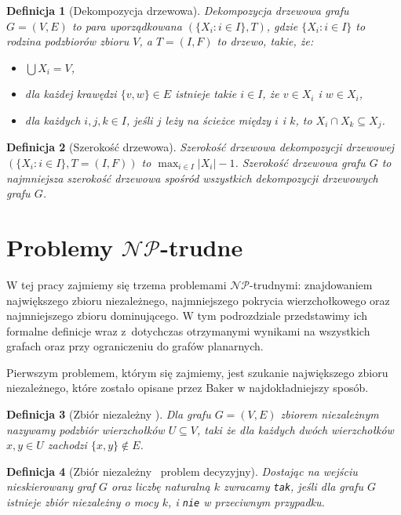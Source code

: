 \documentclass[twoside,a4paper,12pt]{report} %
\theoremstyle{break}
\newtheorem{definition}{Definicja}[section]
\begin{document}
\begin{definition}[Dekompozycja drzewowa]
Dekompozycja drzewowa grafu $G=(V,E)$ to para uporządkowana $(\{X_i\colon i \in I\}, T)$, gdzie $\{X_i\colon i \in I\}$ to rodzina podzbiorów zbioru $V$, a $T=(I,F)$ to drzewo, takie, że:
\begin{itemize}
    \item $\bigcup X_i = V$,
    \item dla każdej krawędzi $\{v,w\} \in E$ istnieje takie $i \in I$, że $v \in X_i$ i $w \in X_i$,
    \item dla każdych $i,j,k \in I$, jeśli $j$ leży na ścieżce między $i$ i $k$, to $X_i \cap X_k \subseteq X_j$.
\end{itemize}
\end{definition}

\begin{definition}[Szerokość drzewowa]
\emph{Szerokość drzewowa dekompozycji drzewowej} $(\{X_i\colon i \in I\}, T=(I,F))$ to $\max_{i \in I} |X_i|-1$. \emph{Szerokość drzewowa grafu $G$} to najmniejsza szerokość drzewowa spośród wszystkich dekompozycji drzewowych grafu $G$.
\end{definition}

\section[Problemy NP-trudne]{Problemy $\mathcal{NP}$-trudne} \label{sekcja_1.2}
W tej pracy zajmiemy się trzema problemami $\mathcal{NP}$-trudnymi: znajdowaniem największego zbioru niezależnego, najmniejszego pokrycia wierzchołkowego oraz najmniejszego zbioru dominującego. W tym podrozdziale przedstawimy ich formalne definicje wraz z~dotychczas otrzymanymi wynikami na wszystkich grafach oraz przy ograniczeniu do grafów planarnych. 

Pierwszym problemem, którym się zajmiemy, jest szukanie największego zbioru niezależnego, które zostało opisane przez Baker w najdokładniejszy sposób.

\begin{definition}[Zbiór niezależny \cite{graph}]
Dla grafu $G=(V,E)$ \emph{zbiorem niezależnym} nazywamy podzbiór wierzchołków $U \subseteq V$, taki że dla każdych dwóch wierzchołków $x,y \in U$ zachodzi $\{x,y\} \notin E$.
\end{definition}

\begin{definition}[Zbiór niezależny \textendash\ problem decyzyjny]
Dostając na wejściu nieskierowany graf $G$ oraz liczbę naturalną $k$ zwracamy \texttt{tak}, jeśli dla grafu $G$ istnieje zbiór niezależny o mocy $k$, i \texttt{nie} w przeciwnym przypadku.
\end{definition}
\end{document}
